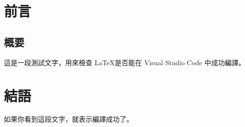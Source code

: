 \documentclass[UTF8, fontset=none]{ctexrep}
\begin{document}
  \chapter{前言}
    \section{概要}
      這是一段測試文字，用來檢查 \LaTeX 是否能在 Visual Studio Code 中成功編譯。
  \chapter{結語}
    如果你看到這段文字，就表示編譯成功了。
\end{document}
